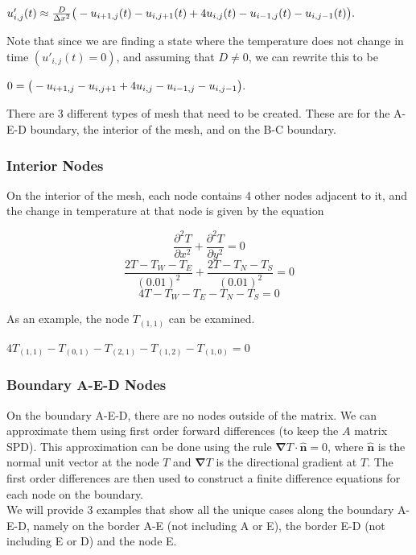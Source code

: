 \documentclass[12pt,a4paper]{article}
\begin{document}
\begin{center}
$u'_{i,j}(t)\approx\frac{D}{\Delta x^2}\big{(}-u_{i+1,j}(t)-u_{i,j+1}(t)+4u_{i,j}(t)-u_{i-1,j}(t)-u_{i,j-1}(t)\big{)}.$
\end{center}
Note that since we are finding a state where the temperature does not change in time $(u'_{i,j}(t)=0)$, and assuming that $D\neq0$, we can rewrite this to be
\begin{center}
  $0=\big{(}-u_{i+1,j}-u_{i,j+1}+4u_{i,j}-u_{i-1,j}-u_{i,j-1}\big{)}.$
\end{center}
There are 3 different types of mesh that need to be created. These are for the A-E-D boundary, the interior of the mesh, and on the B-C boundary.
\subsubsection{Interior Nodes}
On the interior of the mesh, each node contains 4 other nodes adjacent to it, and the change in temperature at that node is given by the equation
\begin{center}
\[\frac{\partial^2 T}{\partial x^2}+\frac{\partial^2 T}{\partial y^2}=0\]
\[\frac{2T-T_W-T_E}{(0.01)^2}+\frac{2T-T_N-T_S}{(0.01)^2}=0\]
\[4T-T_W-T_E-T_N-T_S=0\]
\end{center}
\begin{center}
\end{center}
As an example, the node $T_{(1,1)}$ can be examined.
\begin{center}
  $4T_{(1,1)}-T_{(0,1)}-T_{(2,1)}-T_{(1,2)}-T_{(1,0)}=0$
\end{center}
\subsubsection{Boundary A-E-D Nodes}
On the boundary A-E-D, there are no nodes outside of the matrix. We can approximate them using first order forward differences (to keep the $A$ matrix SPD). This approximation can be done using the rule $\boldsymbol{\nabla} T \cdot {\hat{\textbf{n}}} = 0$, where ${\hat{\textbf{n}}}$ is the normal unit vector at the node $T$ and $\boldsymbol{\nabla} T$ is the directional gradient at $T$. The first order differences are then used to construct a finite difference equations for each node on the boundary.\\We will provide 3 examples that show all the unique cases along the boundary A-E-D, namely on the border A-E (not including A or E), the border E-D (not including E or D) and the node E.
\end{document}
